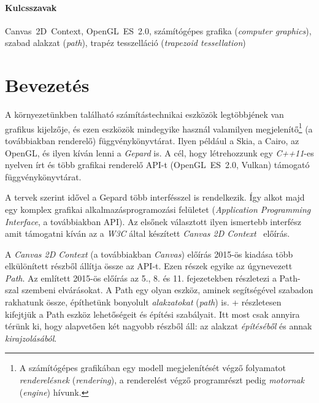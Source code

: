 \documentclass[12pt]{report}
\theoremstyle{definition}
\newcommand{\inenglish}[1]{\textsl{#1}}
\newcommand{\inenglishfn}[1]{\footnotesize{\inenglish{#1}}}
\begin{document}
    \subsubsection*{Kulcsszavak}

 Canvas~2D~Context, OpenGL~ES~2.0, számítógépes grafika (\inenglish{computer
 graphics}), szabad alakzat (\inenglish{path}), trapéz tesszelláció
 (\inenglish{trapezoid tessellation})



    \chapter*{Bevezetés}
    \label{sec:Bevezetés}

A környezetünkben található számítástechnikai eszközök legtöbbjének van
grafikus kijelzője, és ezen eszközök mindegyike használ valamilyen
megjelenítő\footnote{A számítógépes grafikában egy modell megjelenítését végző
folyamatot \emph{renderelésnek} (\inenglishfn{rendering}), a renderelést végző
programrészt pedig \emph{motornak} (\inenglishfn{engine}) hívunk.} (a
továbbiakban renderelő) függvénykönyvtárat. Ilyen például a Skia, a Cairo, az
OpenGL, és ilyen kíván lenni a \emph{Gepard} is. A cél, hogy létrehozzunk egy
\emph{C++11}-es nyelven írt és több grafikai renderelő API-t (OpenGL~ES~2.0,
Vulkan) támogató függvénykönyvtárat.

A tervek szerint idővel a Gepard több interfésszel is rendelkezik. Így alkot
majd egy komplex grafikai alkalmazásprogramozási felületet
(\inenglish{Application Programming Interface}, a továbbiakban API). Az elsőnek
választott ilyen ismertebb interfész amit támogatni kíván az a \emph{W3C} által
készített \emph{Canvas 2D Context}~\cite{Cabanier:14:HCC} előírás.

A \emph{Canvas 2D Context} (a továbbiakban \emph{Canvas}) előírás 2015-ös
kiadása több elkülönített részből állítja össze az API-t. Ezen részek egyike az
úgynevezett \emph{Path}. Az említett 2015-ös előírás az 5., 8. és 11.
fejezetekben részletezi a Path-szal szembeni elvárásokat. A Path egy olyan
eszköz, aminek segítségével szabadon rakhatunk össze, építhetünk bonyolult
\emph{alakzatokat} (\inenglish{path}) is. \Az+
részletesen kifejtjük a Path eszköz lehetőségeit és építési szabályait. Itt
most csak annyira térünk ki, hogy alapvetően két nagyobb részből áll: az
alakzat \emph{építéséből} és annak \emph{kirajzolásából}.
\end{document}
